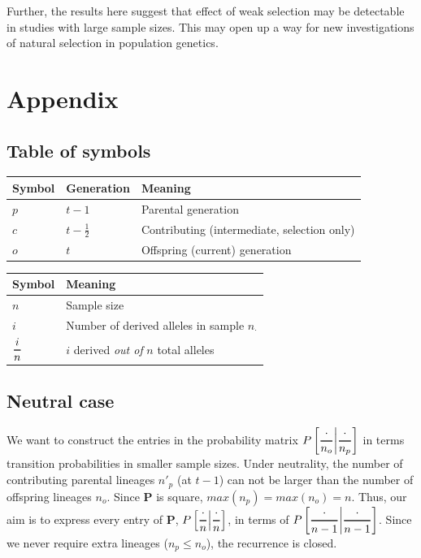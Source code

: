 \documentclass[review]{elsarticle}
\newcommand{\Dfrac}[2]{%
  \ooalign{%
    $\genfrac{}{}{1.2pt}0{#1}{#2}$\cr%
    $\color{white}\genfrac{}{}{.4pt}0{\phantom{#1}}{\phantom{#2}}$}%
}
\newcommand{\cond}{\middle\vert}
\begin{document}
Further, the results here suggest that effect of weak selection may be detectable in studies with
large sample sizes. This may open up a way for new investigations of natural selection in population
genetics.



\section{Appendix}
\subsection{Table of symbols}

\label{ssec:tab-symbols}
\begin{center}
\begin{tabular}{lll}
Symbol & Generation & Meaning\\
\hline
$p$ & $t-1$ & Parental generation\\
$c$ & $t-\frac{1}{2}$ & Contributing (intermediate, selection only)\\
$o$ & $t$ & Offspring (current) generation\\
\end{tabular}
\end{center}

\begin{center}
\begin{tabular}{ll}
Symbol & Meaning\\
\hline
$n$ & Sample size\\
$i$ & Number of derived alleles in sample $n_{\cdot}$\\
$\Dfrac{i}{n}$ & $i$ derived \emph{out of} $n$ total alleles\\
\end{tabular}
\end{center}

\subsection{Neutral case}

We want to construct the entries in the probability matrix
$P\left[ \Dfrac{\cdot}{n_o} \cond \Dfrac{\cdot}{n_p} \right]$ in terms transition probabilities in
smaller sample sizes. Under neutrality, the number of contributing parental lineages $n'_p$ (at
$t-1$) can not be larger than the number of offspring lineages $n_o$. Since $\mathbf{P}$ is square,
$max(n_p)=max(n_o)=n$. Thus, our aim is to express every entry of $\mathbf{P}$,
$P\left[ \Dfrac{\cdot}{n} \cond\Dfrac{\cdot}{n} \right]$, in terms of
$P\left[ \Dfrac{\cdot}{n-1} \cond \Dfrac{\cdot}{n-1} \right]$. Since we never require extra lineages
($n_p\le n_o$), the recurrence is closed.
\end{document}
